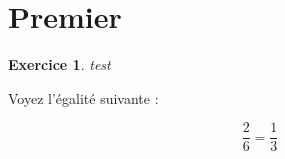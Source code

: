 \documentclass[12pt]{article}
\newtheorem{exo}{Exercice}
\begin{document}
\section{Premier}

\begin{exo}
  test
\end{exo}

Voyez l'égalité suivante :

$$\frac{2}{6}=\frac{1}{3}$$
\end{document}
